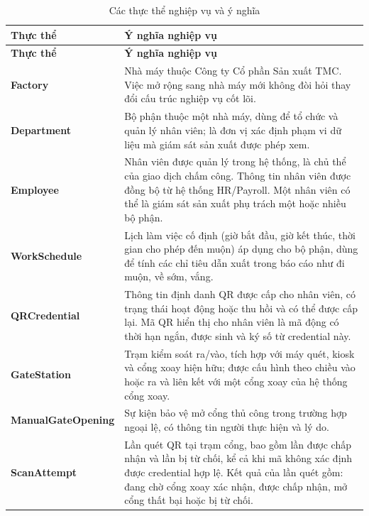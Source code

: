 \begingroup
\small
\renewcommand{\arraystretch}{1.2}
\begin{longtable}{|>{\raggedright\arraybackslash}m{4.5cm}|>{\raggedright\arraybackslash}m{11cm}|}
    \caption{Các thực thể nghiệp vụ và ý nghĩa}\label{tab:business-entities}\\
    \hline
    \textbf{Thực thể} & \textbf{Ý nghĩa nghiệp vụ}\\
    \hline
    \endfirsthead
    \hline
    \textbf{Thực thể} & \textbf{Ý nghĩa nghiệp vụ}\\
    \hline
    \endhead
    \hline
    \endfoot
    \hline
    \endlastfoot
    \textbf{Factory} & Nhà máy thuộc Công ty Cổ phần Sản xuất TMC. Việc mở rộng sang nhà máy mới không đòi hỏi thay đổi cấu trúc nghiệp vụ cốt lõi.\\
    \hline
    \textbf{Department} & Bộ phận thuộc một nhà máy, dùng để tổ chức và quản lý nhân viên; là đơn vị xác định phạm vi dữ liệu mà giám sát sản xuất được phép xem.\\
    \hline
    \textbf{Employee} & Nhân viên được quản lý trong hệ thống, là chủ thể của giao dịch chấm công. Thông tin nhân viên được đồng bộ từ hệ thống HR/Payroll. Một nhân viên có thể là giám sát sản xuất phụ trách một hoặc nhiều bộ phận.\\
    \hline
    \textbf{WorkSchedule} & Lịch làm việc cố định (giờ bắt đầu, giờ kết thúc, thời gian cho phép đến muộn) áp dụng cho bộ phận, dùng để tính các chỉ tiêu dẫn xuất trong báo cáo như đi muộn, về sớm, vắng.\\
    \hline
    \textbf{QRCredential} & Thông tin định danh QR được cấp cho nhân viên, có trạng thái hoạt động hoặc thu hồi và có thể được cấp lại. Mã QR hiển thị cho nhân viên là mã động có thời hạn ngắn, được sinh và ký số từ credential này.\\
    \hline
    \textbf{GateStation} & Trạm kiểm soát ra/vào, tích hợp với máy quét, kiosk và cổng xoay hiện hữu; được cấu hình theo chiều vào hoặc ra và liên kết với một cổng xoay của hệ thống cổng xoay.\\
    \hline
    \textbf{ManualGateOpening} & Sự kiện bảo vệ mở cổng thủ công trong trường hợp ngoại lệ, có thông tin người thực hiện và lý do.\\
    \hline
    \textbf{ScanAttempt} & Lần quét QR tại trạm cổng, bao gồm lần được chấp nhận và lần bị từ chối, kể cả khi mã không xác định được credential hợp lệ. Kết quả của lần quét gồm: đang chờ cổng xoay xác nhận, được chấp nhận, mở cổng thất bại hoặc bị từ chối.\\
    \hline

\end{longtable}
